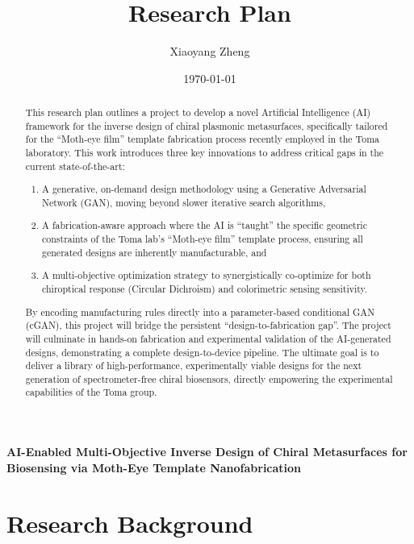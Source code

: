 \documentclass[12pt,a4paper]{article}
\title{Research Plan}
\author{Xiaoyang Zheng}
\date{\today}
\begin{document}
\maketitle
\begin{center}
    \large \textbf{AI-Enabled Multi-Objective Inverse Design of Chiral Metasurfaces for Biosensing via Moth-Eye Template Nanofabrication}
\end{center}
\sloppy

\begin{abstract}
This research plan outlines a project to develop a novel Artificial Intelligence (AI) framework for the inverse design of chiral plasmonic metasurfaces, specifically tailored for the ``Moth-eye film'' template fabrication process recently employed in the Toma laboratory. This work introduces three key innovations to address critical gaps in the current state-of-the-art:
\begin{enumerate}
  \item A generative, on-demand design methodology using a Generative Adversarial Network (GAN), moving beyond slower iterative search algorithms,
  \item A fabrication-aware approach where the AI is ``taught'' the specific geometric constraints of the Toma lab's ``Moth-eye film'' template process, ensuring all generated designs are inherently manufacturable, and
  \item A multi-objective optimization strategy to synergistically co-optimize for both chiroptical response (Circular Dichroism) and colorimetric sensing sensitivity.
\end{enumerate}
By encoding manufacturing rules directly into a parameter-based conditional GAN (cGAN), this project will bridge the persistent ``design-to-fabrication gap''. The project will culminate in hands-on fabrication and experimental validation of the AI-generated designs, demonstrating a complete design-to-device pipeline. The ultimate goal is to deliver a library of high-performance, experimentally viable designs for the next generation of spectrometer-free chiral biosensors, directly empowering the experimental capabilities of the Toma group.
\end{abstract}

\section{Research Background}
\end{document}
